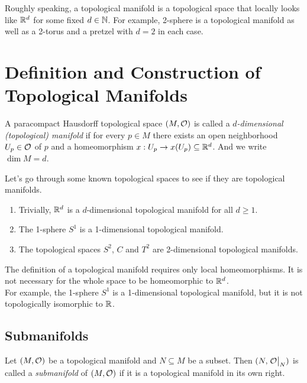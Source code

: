 
Roughly speaking, a topological manifold is a topological space that locally looks like \(\mathbb R^d\) for some fixed \(d \in \mathbb N\). For example, 2-sphere is a topological manifold as well as a 2-torus and a pretzel with \(d = 2\) in each case.

\section{Definition and Construction of Topological Manifolds}

\begin{definition}
	A paracompact Hausdorff topological space \((M, \mathcal{O})\) is called a \emph{\(d\)-dimensional (topological) manifold} if for every \(p \in M\) there exists an open neighborhood \(U_p \in \mathcal{O}\) of \(p\) and a homeomorphism \(x: U_p \to x(U_p) \subseteq \mathbb R^d\). And we write \(\dim{M} = d\).
\end{definition}

\begin{example}
	Let's go through some known topological spaces to see if they are topological manifolds.
	\begin{enumerate}
		\item Trivially, \(\mathbb R^d\) is a \(d\)-dimensional topological manifold for all \(d \ge 1\).
		\item The 1-sphere \(S^1\) is a 1-dimensional topological manifold.
		\item The topological spaces \(S^2\), \(C\) and \(T^2\) are 2-dimensional topological manifolds.
	\end{enumerate}
\end{example}

\begin{remark}
	The definition of a topological manifold requires only local homeomorphisms. It is not necessary for the whole space to be homeomorphic to \(\mathbb R^d\). \\
	For example, the 1-sphere \(S^1\) is a 1-dimensional topological manifold, but it is not topologically isomorphic to \(\mathbb R\).
\end{remark}

\subsection{Submanifolds}

\begin{definition}[Submanifold]
	Let \((M, \mathcal{O})\) be a topological manifold and \(N \subseteq M\) be a subset. Then \((N, \eval{\CO}_N)\) is called a \emph{submanifold} of \((M, \mathcal{O})\) if it is a topological manifold in its own right.
\end{definition}

